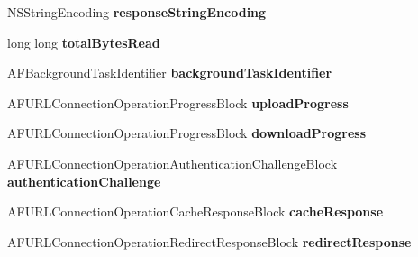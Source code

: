 \begin{DoxyCompactItemize}
\item 
\hypertarget{category_a_f_u_r_l_connection_operation_07_08_a4fd7b6c934c563e034e45d34ad77b7c4}{}N\+S\+String\+Encoding {\bfseries response\+String\+Encoding}\label{category_a_f_u_r_l_connection_operation_07_08_a4fd7b6c934c563e034e45d34ad77b7c4}

\item 
\hypertarget{category_a_f_u_r_l_connection_operation_07_08_a08a500031a7a4cd7cfa97f041b471a31}{}long long {\bfseries total\+Bytes\+Read}\label{category_a_f_u_r_l_connection_operation_07_08_a08a500031a7a4cd7cfa97f041b471a31}

\item 
\hypertarget{category_a_f_u_r_l_connection_operation_07_08_af0838eb9c35354325d7e67e9168a674c}{}A\+F\+Background\+Task\+Identifier {\bfseries background\+Task\+Identifier}\label{category_a_f_u_r_l_connection_operation_07_08_af0838eb9c35354325d7e67e9168a674c}

\item 
\hypertarget{category_a_f_u_r_l_connection_operation_07_08_afe3a5f549dbbda0c5706cd6d7da0590d}{}A\+F\+U\+R\+L\+Connection\+Operation\+Progress\+Block {\bfseries upload\+Progress}\label{category_a_f_u_r_l_connection_operation_07_08_afe3a5f549dbbda0c5706cd6d7da0590d}

\item 
\hypertarget{category_a_f_u_r_l_connection_operation_07_08_a2530110594741aa405724fe3d65228be}{}A\+F\+U\+R\+L\+Connection\+Operation\+Progress\+Block {\bfseries download\+Progress}\label{category_a_f_u_r_l_connection_operation_07_08_a2530110594741aa405724fe3d65228be}

\item 
\hypertarget{category_a_f_u_r_l_connection_operation_07_08_a5434bfc8e3d49e5a3f5593608772eb81}{}A\+F\+U\+R\+L\+Connection\+Operation\+Authentication\+Challenge\+Block {\bfseries authentication\+Challenge}\label{category_a_f_u_r_l_connection_operation_07_08_a5434bfc8e3d49e5a3f5593608772eb81}

\item 
\hypertarget{category_a_f_u_r_l_connection_operation_07_08_aadc13584209a85e46794bf1aaa063581}{}A\+F\+U\+R\+L\+Connection\+Operation\+Cache\+Response\+Block {\bfseries cache\+Response}\label{category_a_f_u_r_l_connection_operation_07_08_aadc13584209a85e46794bf1aaa063581}

\item 
\hypertarget{category_a_f_u_r_l_connection_operation_07_08_a91653021425e07347c28dc02dc650082}{}A\+F\+U\+R\+L\+Connection\+Operation\+Redirect\+Response\+Block {\bfseries redirect\+Response}\label{category_a_f_u_r_l_connection_operation_07_08_a91653021425e07347c28dc02dc650082}

\end{DoxyCompactItemize}


